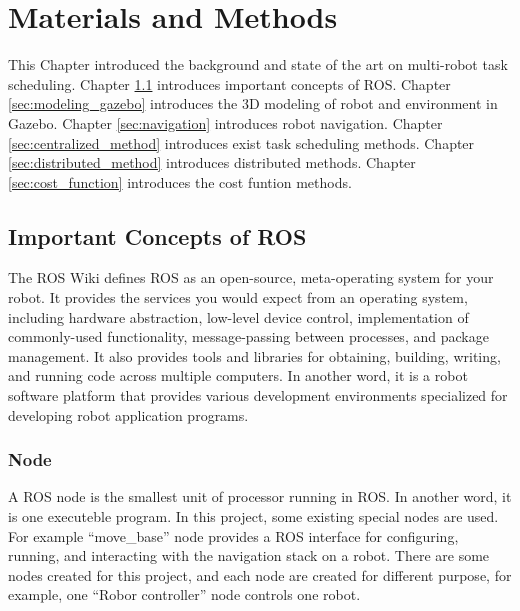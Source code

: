 \chapter{Materials and Methods}




This Chapter introduced the background and state of the art on multi-robot task scheduling. Chapter \ref{sec:ros_concepts} introduces important concepts of ROS. Chapter \ref{sec:modeling_gazebo} introduces the 3D modeling of robot and environment in Gazebo. Chapter \ref{sec:navigation} introduces robot navigation. Chapter \ref{sec:centralized_method} introduces exist task scheduling methods. Chapter \ref{sec:distributed_method} introduces distributed methods. Chapter \ref{sec:cost_function} introduces the cost funtion methods.

\section{Important Concepts of ROS}
\label{sec:ros_concepts}
The ROS Wiki \cite{ros} defines ROS as an open-source, meta-operating system for your robot. It provides the services you would expect from an operating system, including hardware abstraction, low-level device control, implementation of commonly-used functionality, message-passing between processes, and package management. It also provides tools and libraries for obtaining, building, writing, and running code across multiple computers.
In another word, it is a robot software platform that provides various development environments specialized for developing robot application programs\cite{Pyo17}.

\subsection{Node}
A ROS node is the smallest unit of processor running in ROS. In another word, it is one executeble program. In this project, some existing special nodes are used. For example ``move\_base'' node provides a ROS interface for configuring, running, and interacting with the navigation stack on a robot. There are some nodes created for this project, and each node are created for different purpose, for example, one ``Robor controller'' node controls one robot. 

